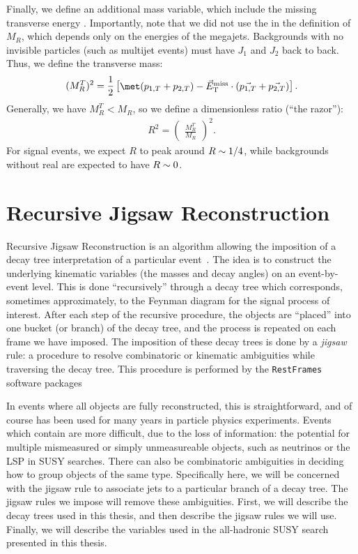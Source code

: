 Finally, we define an additional mass variable, which include the missing transverse energy \met.
Importantly, note that we did not use the \met in the definition of $M_R$, which depends only on the energies of the megajets.
Backgrounds with no invisible particles (such as multijet events) must have $J_1$ and $J_2$ back to back.
Thus, we define the transverse mass:
\begin{align}
(M_R^T)^2 = \frac{1}{2} \begin{bmatrix} \met(p_{1,T}  + p_{2,T}) - \metvec \cdot (\vec{p_{1,T}}  + \vec{p_{2,T} })  \end{bmatrix}.
\end{align}
Generally, we have $M_R^T < M_R$, so we define a dimensionless ratio (``the razor''):
\begin{align}
R^2 = \begin{pmatrix} \frac{M_R^T}{M_R} \end{pmatrix}^2.
\end{align}
For signal events, we expect $R$ to peak around $R \sim 1/4$, while backgrounds without real \met are expected to have $R \sim 0$.

\section{Recursive Jigsaw Reconstruction}

Recursive Jigsaw Reconstruction is an algorithm allowing the imposition of a decay tree interpretation of a particular event~\cite{Jackson:2016mfb,ATLAS-CONF-2016-078}.
The idea is to construct the underlying kinematic variables (the masses and decay angles) on an event-by-event level.
This is done ``recursively'' through a decay tree which corresponds, sometimes approximately, to the Feynman diagram for the signal process of interest.
After each step of the recursive procedure, the objects are ``placed'' into one bucket (or branch) of the decay tree, and the process is repeated on each frame we have imposed.
The imposition of these decay trees is done by a \textit{jigsaw} rule: a procedure to resolve combinatoric or kinematic ambiguities while traversing the decay tree.
This procedure is performed by the \texttt{RestFrames} software packages ~\cite{RestFrames}

In events where all objects are fully reconstructed, this is straightforward, and of course has been used for many years in particle physics experiments.
Events which contain \met are more difficult, due to the loss of information: the potential for multiple mismeasured or simply unmeasureable objects, such as neutrinos or the LSP in SUSY searches.
There can also be combinatoric ambiguities in deciding how to group objects of the same type.
Specifically here, we will be concerned with the jigsaw rule to associate jets to a particular branch of a decay tree.
The jigsaw rules we impose will remove these ambiguities.
First, we will describe the decay trees used in this thesis, and then describe the jigsaw rules we will use.
Finally, we will describe the variables used in the all-hadronic SUSY search presented in this thesis.

